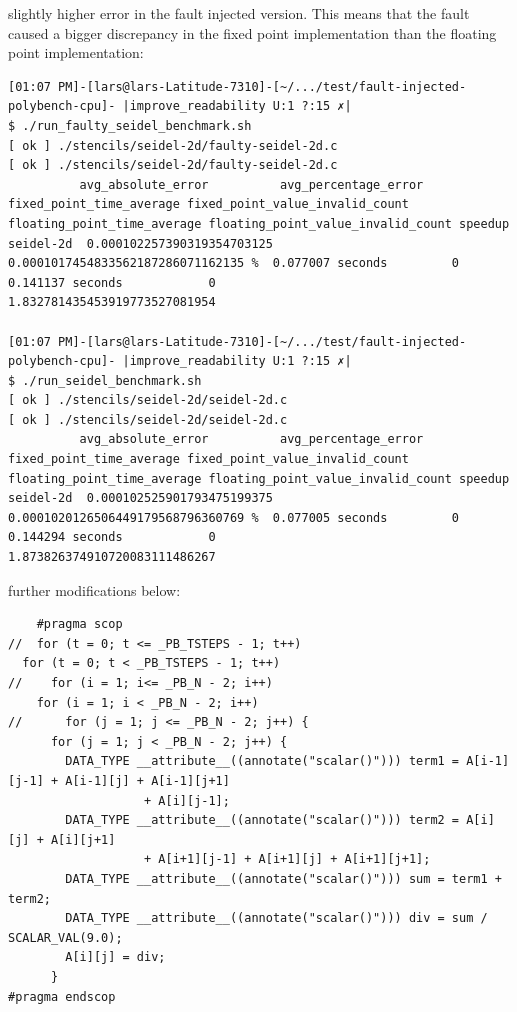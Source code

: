 slightly higher error in the fault injected version. This means that the fault caused a bigger discrepancy in the fixed point implementation than the floating point implementation:

\begin{verbatim}
[01:07 PM]-[lars@lars-Latitude-7310]-[~/.../test/fault-injected-polybench-cpu]- |improve_readability U:1 ?:15 ✗|
$ ./run_faulty_seidel_benchmark.sh 
[ ok ] ./stencils/seidel-2d/faulty-seidel-2d.c 
[ ok ] ./stencils/seidel-2d/faulty-seidel-2d.c 
          avg_absolute_error          avg_percentage_error                 fixed_point_time_average fixed_point_value_invalid_count floating_point_time_average floating_point_value_invalid_count speedup                       
seidel-2d  0.000102257390319354703125  0.0001017454833562187286071162135 %  0.077007 seconds         0                               0.141137 seconds            0                                  1.832781435453919773527081954

[01:07 PM]-[lars@lars-Latitude-7310]-[~/.../test/fault-injected-polybench-cpu]- |improve_readability U:1 ?:15 ✗|
$ ./run_seidel_benchmark.sh 
[ ok ] ./stencils/seidel-2d/seidel-2d.c
[ ok ] ./stencils/seidel-2d/seidel-2d.c
          avg_absolute_error          avg_percentage_error                 fixed_point_time_average fixed_point_value_invalid_count floating_point_time_average floating_point_value_invalid_count speedup                       
seidel-2d  0.000102525901793475199375  0.0001020126506449179568796360769 %  0.077005 seconds         0                               0.144294 seconds            0                                  1.873826374910720083111486267
\end{verbatim}




further modifications below:
\begin{verbatim}
    #pragma scop
//  for (t = 0; t <= _PB_TSTEPS - 1; t++)
  for (t = 0; t < _PB_TSTEPS - 1; t++)
//    for (i = 1; i<= _PB_N - 2; i++)
    for (i = 1; i < _PB_N - 2; i++)
//      for (j = 1; j <= _PB_N - 2; j++) {
      for (j = 1; j < _PB_N - 2; j++) {
        DATA_TYPE __attribute__((annotate("scalar()"))) term1 = A[i-1][j-1] + A[i-1][j] + A[i-1][j+1]
                   + A[i][j-1];
        DATA_TYPE __attribute__((annotate("scalar()"))) term2 = A[i][j] + A[i][j+1]
                   + A[i+1][j-1] + A[i+1][j] + A[i+1][j+1];
        DATA_TYPE __attribute__((annotate("scalar()"))) sum = term1 + term2;
        DATA_TYPE __attribute__((annotate("scalar()"))) div = sum / SCALAR_VAL(9.0);
        A[i][j] = div;
      }
#pragma endscop
\end{verbatim}

